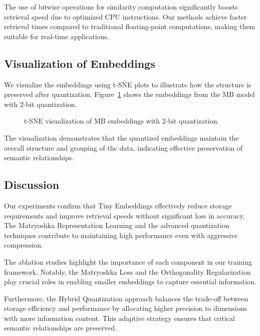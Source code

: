 The use of bitwise operations for similarity computation significantly boosts retrieval speed due to optimized CPU instructions. Our methods achieve faster retrieval times compared to traditional floating-point computations, making them suitable for real-time applications.

\subsection{Visualization of Embeddings}

We visualize the embeddings using t-SNE plots to illustrate how the structure is preserved after quantization. Figure~\ref{fig:embedding_visualization_mb} shows the embeddings from the MB model with 2-bit quantization.

\begin{figure}[ht]
    \centering
    \caption{t-SNE visualization of MB embeddings with 2-bit quantization.}
    \label{fig:embedding_visualization_mb}
\end{figure}

The visualization demonstrates that the quantized embeddings maintain the overall structure and grouping of the data, indicating effective preservation of semantic relationships.

\subsection{Discussion}

Our experiments confirm that Tiny Embeddings effectively reduce storage requirements and improve retrieval speeds without significant loss in accuracy. The Matryoshka Representation Learning and the advanced quantization techniques contribute to maintaining high performance even with aggressive compression.

The ablation studies highlight the importance of each component in our training framework. Notably, the Matryoshka Loss and the Orthogonality Regularization play crucial roles in enabling smaller embeddings to capture essential information.

Furthermore, the Hybrid Quantization approach balances the trade-off between storage efficiency and performance by allocating higher precision to dimensions with more information content. This adaptive strategy ensures that critical semantic relationships are preserved.

